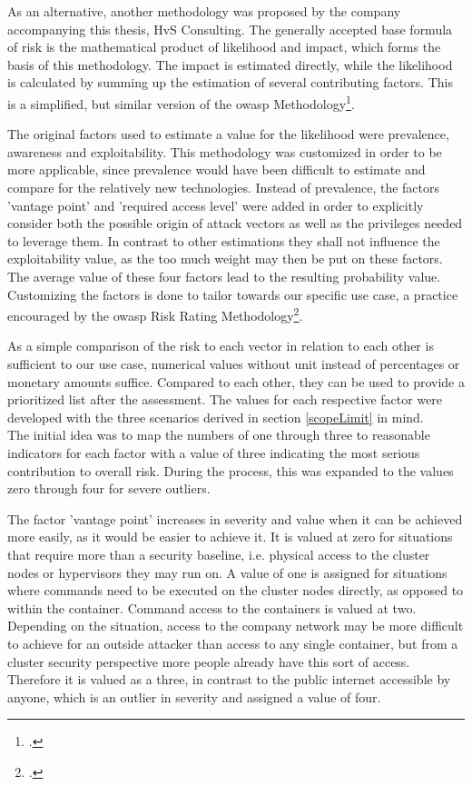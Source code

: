 As an alternative, another methodology was proposed by the company accompanying this thesis, HvS Consulting. The generally accepted base formula of risk is the mathematical product of likelihood and impact, which forms the basis of this methodology. The impact is estimated directly, while the likelihood is calculated by summing up the estimation of several contributing factors. This is a simplified, but similar version of the \gls{owasp} Methodology\footcite[][, section 'Step 4: Determining the Severity of the Risk']{riskRating}. 

The original factors used to estimate a value for the likelihood were prevalence, awareness and exploitability. This methodology was customized in order to be more applicable, since prevalence would have been difficult to estimate and compare for the relatively new technologies. Instead of prevalence, the factors 'vantage point' and 'required access level' were added in order to explicitly consider both the possible origin of attack vectors as well as the privileges needed to leverage them. In contrast to other estimations they shall not influence the exploitability value, as the too much weight may then be put on these factors. The average value of these four factors lead to the resulting probability value. Customizing the factors is done to tailor towards our specific use case, a practice encouraged by the \gls{owasp} Risk Rating Methodology\footcite[][, section 'Step 6: Customizing the Risk Rating Model']{riskRating}.

As a simple comparison of the risk to each vector in relation to each other is sufficient to our use case, numerical values without unit instead of percentages or monetary amounts suffice. Compared to each other, they can be used to provide a prioritized list after the assessment.
The values for each respective factor were developed with the three scenarios derived in section \ref{scopeLimit} in mind. \\
The initial idea was to map the numbers of one through three to reasonable indicators for each factor with a value of three indicating the most serious contribution to overall risk. During the process, this was expanded to the values zero through four for severe outliers.

The factor 'vantage point' increases in severity and value when it can be achieved more easily, as it would be easier to achieve it. It is valued at zero for situations that require more than a security baseline, i.e. physical access to the cluster nodes or hypervisors they may run on. A value of one is assigned for situations where commands need to be executed on the cluster nodes directly, as opposed to within the container. Command access to the containers is valued at two. Depending on the situation, access to the company network may be more difficult to achieve for an outside attacker than access to any single container, but from a cluster security perspective more people already have this sort of access. Therefore it is valued as a three, in contrast to the public internet accessible by anyone, which is an outlier in severity and assigned a value of four.

